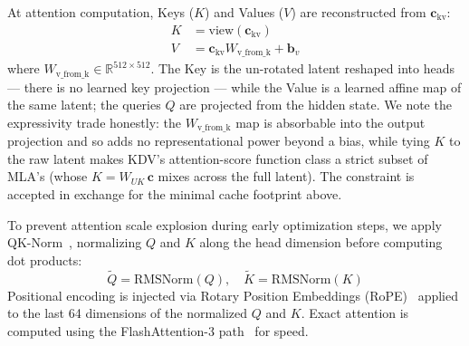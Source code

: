 \documentclass[11pt,twocolumn]{article}
\begin{document}
At attention computation, Keys ($K$) and Values ($V$) are reconstructed from $\mathbf{c}_{\text{kv}}$:
\begin{align}
K &= \text{view}(\mathbf{c}_{\text{kv}}) \\
V &= \mathbf{c}_{\text{kv}} W_{\text{v\_from\_k}} + \mathbf{b}_v
\end{align}
where $W_{\text{v\_from\_k}} \in \mathbb{R}^{512 \times 512}$. The Key is the un-rotated latent reshaped into heads --- there is no learned key projection --- while the Value is a learned affine map of the same latent; the queries $Q$ are projected from the hidden state. We note the expressivity trade honestly: the $W_{\text{v\_from\_k}}$ map is absorbable into the output projection and so adds no representational power beyond a bias, while tying $K$ to the raw latent makes KDV's attention-score function class a strict subset of MLA's (whose $K = W_{UK}\,\mathbf{c}$ mixes across the full latent). The constraint is accepted in exchange for the minimal cache footprint above.

To prevent attention scale explosion during early optimization steps, we apply QK-Norm~\cite{qknorm2020}, normalizing $Q$ and $K$ along the head dimension before computing dot products:
\begin{equation}
\tilde{Q} = \text{RMSNorm}(Q), \quad \tilde{K} = \text{RMSNorm}(K)
\end{equation}
Positional encoding is injected via Rotary Position Embeddings (RoPE)~\cite{rope2021} applied to the last 64 dimensions of the normalized $Q$ and $K$. Exact attention is computed using the FlashAttention-3 path~\cite{flashattn3} for speed.
\end{document}
